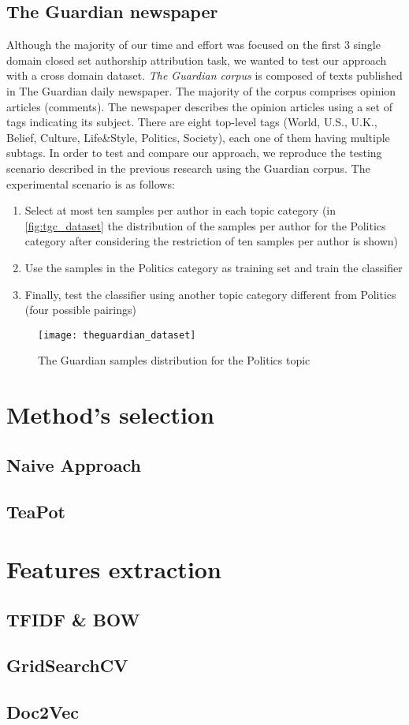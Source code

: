\subsection{The Guardian newspaper}
Although the majority of our time and effort was focused on the first 3 single domain closed set authorship attribution task, we wanted to test our approach with a cross domain dataset.
\textit{The Guardian corpus} is composed of texts published in The Guardian daily newspaper. The majority of the corpus comprises opinion articles
(comments). The newspaper describes the opinion articles using a set of tags indicating its subject. There are eight top-level tags (World, U.S., U.K., Belief, Culture, Life\&Style, Politics, Society), each one of them having multiple subtags.
In order to test and compare our approach, we reproduce the testing scenario
described in the previous research \cite{stamatatos2013robustness} using the Guardian corpus. The experimental
scenario is as follows: 
\begin{enumerate}
	\item Select at most ten samples per author in each topic category
	(in \autoref{fig:tgc_dataset} the distribution of the samples per author for the Politics category after considering
	the restriction of ten samples per author is shown)
	\item Use the samples in the Politics category as training set and train the classifier
	\item Finally, test the classifier using
	another topic category different from Politics (four possible pairings)
\end{enumerate}

\begin{figure}[ht]
	\centering
	\texttt{[image: theguardian\_dataset]}
	\caption[The Guardian Politics samples distribution]{The Guardian samples distribution for the Politics topic}
	\label{fig:tgc_dataset}
\end{figure}

\section{Method's selection}
\subsection{Naive Approach}
\subsection{TeaPot}

\section{Features extraction}
\subsection{TFIDF \& BOW}
\subsection{GridSearchCV}
\subsection{Doc2Vec}


